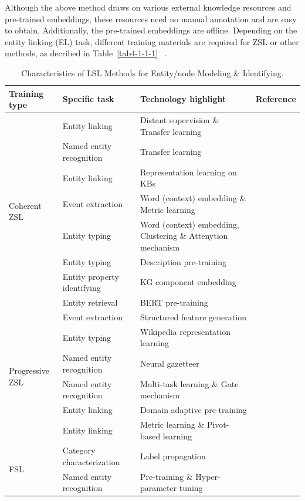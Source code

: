 Although the above method draws on various external knowledge resources and pre-trained embeddings, these resources need no manual annotation and are easy to obtain. Additionally,  the pre-trained embeddings are offline. Depending on the entity linking (EL) task, different training materials are required for ZSL or other methods, as decribed in  Table~\ref{tab4-1-1-1}  ~.
\begin{table}[t]
\centering
\footnotesize
\caption{ Characteristics of LSL Methods for Entity/node Modeling \& Identifying.}
\label{tab4-1-1-2}
\begin{tabular}{p{50pt}|p{90pt}|p{130pt}|p{80pt}}
\hline
Training type & Specific task & Technology highlight & Reference \\
\hline
\multirow{8}{50pt}[-15pt]{Coherent ZSL} & Entity linking & Distant supervision \& Transfer learning &  \\
\cline{2-4}
 & Named entity recognition & Transfer learning &  \\
\cline{2-4}
 & Entity linking & Representation learning on KBs &  \\
\cline{2-4}
 & Event extraction & Word (context) embedding \& Metric learning &  \\
\cline{2-4}
 & Entity typing & Word (context) embedding, Clustering \& Attenytion mechanism &  \\
\cline{2-4}
 & Entity typing & Description pre-training &  \\
\cline{2-4}
 & Entity property identifying & KG component embedding &  \\
\cline{2-4}
 & Entity retrieval & BERT pre-training &  \\
\hline
\multirow{6}{50pt}[-2pt]{Progressive ZSL} & Event extraction & Structured feature generation &  \\
\cline{2-4}
 & Entity typing & Wikipedia representation learning &  \\
\cline{2-4}
 & Named entity recognition & Neural gazetteer &  \\
\cline{2-4}
 & Named entity recognition & Multi-task learning \& Gate mechanism &  \\
\cline{2-4}
 & Entity linking & Domain adaptive pre-training &  \\
\cline{2-4}
 & Entity linking & Metric learning \& Pivot-based learning &  \\
\hline
\multirow{9}{50pt}[-6pt]{FSL} & Category characterization & Label propagation &  \\
\cline{2-4}
 & Named entity recognition & Pre-training \& Hyper-parameter tuning &  \\

\end{tabular}
\end{table}

